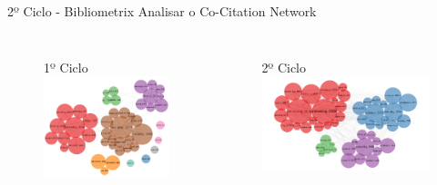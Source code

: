 \begin{frame}{2º Ciclo - Bibliometrix}
	Analisar o Co-Citation Network
	\begin{columns}
		\begin{figure}[hb]
      1º Ciclo
			\includegraphics[width=1\textwidth]{figures/bibliometrix/brede1.png}
		\end{figure}
		\begin{figure}[ht]
      2º Ciclo
			\includegraphics[width=1\textwidth]{figures/bibliometrix/brede2.png}
		\end{figure}
	\end{columns}
\end{frame}

